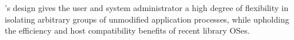 \sysname{}'s design gives the user and system administrator a high degree of flexibility
in isolating arbitrary groups of unmodified application processes,
while upholding the efficiency and host compatibility benefits of recent library OSes.


